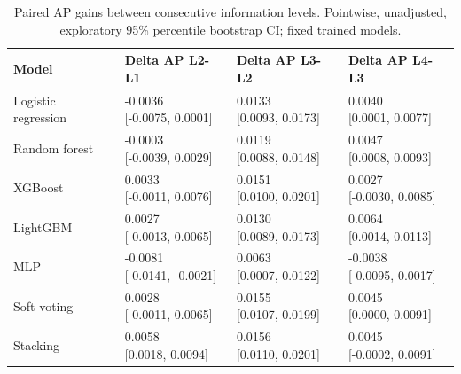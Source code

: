 \begin{table}[htbp]
\centering
\small
\caption{Paired AP gains between consecutive information levels. Pointwise, unadjusted, exploratory 95\% percentile bootstrap CI; fixed trained models.}
\label{tab:rq2-sequential-gains}
\begin{tabular}{llll}
\toprule
Model & Delta AP L2-L1 & Delta AP L3-L2 & Delta AP L4-L3 \\
\midrule
Logistic regression & \shortstack{{-0.0036} \\ {[-0.0075, 0.0001]}} & \shortstack{{0.0133} \\ {[0.0093, 0.0173]}} & \shortstack{{0.0040} \\ {[0.0001, 0.0077]}} \\
Random forest & \shortstack{{-0.0003} \\ {[-0.0039, 0.0029]}} & \shortstack{{0.0119} \\ {[0.0088, 0.0148]}} & \shortstack{{0.0047} \\ {[0.0008, 0.0093]}} \\
XGBoost & \shortstack{{0.0033} \\ {[-0.0011, 0.0076]}} & \shortstack{{0.0151} \\ {[0.0100, 0.0201]}} & \shortstack{{0.0027} \\ {[-0.0030, 0.0085]}} \\
LightGBM & \shortstack{{0.0027} \\ {[-0.0013, 0.0065]}} & \shortstack{{0.0130} \\ {[0.0089, 0.0173]}} & \shortstack{{0.0064} \\ {[0.0014, 0.0113]}} \\
MLP & \shortstack{{-0.0081} \\ {[-0.0141, -0.0021]}} & \shortstack{{0.0063} \\ {[0.0007, 0.0122]}} & \shortstack{{-0.0038} \\ {[-0.0095, 0.0017]}} \\
Soft voting & \shortstack{{0.0028} \\ {[-0.0011, 0.0065]}} & \shortstack{{0.0155} \\ {[0.0107, 0.0199]}} & \shortstack{{0.0045} \\ {[0.0000, 0.0091]}} \\
Stacking & \shortstack{{0.0058} \\ {[0.0018, 0.0094]}} & \shortstack{{0.0156} \\ {[0.0110, 0.0201]}} & \shortstack{{0.0045} \\ {[-0.0002, 0.0091]}} \\
\bottomrule
\end{tabular}
\end{table}

